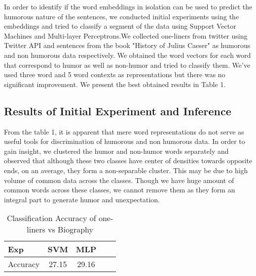 \documentclass{acm_proc_article-sp}
\begin{document}
In order to identify if the word embeddings in isolation can be used to predict the humorous nature of the sentences, we conducted initial experiments using the embeddings and tried to classify a segment of the data using Support Vector Machines and Multi-layer Perceptrons.We collected one-liners from twitter using Twitter API and sentences from the book "History of Julius Caeser" as humorous and non humorous data respectively.
We obtained the word vectors for each word that correspond to humor as well as non-humor and tried to classify them. We've used three word and 5 word contexts as representations but there was no significant improvement. We present the best obtained results in Table 1.


\subsection{ Results of Initial Experiment and Inference}

From the table 1, it is apparent that mere word representations do not serve as useful tools for discrimination of humorous and non humorous data.
In order to gain insight, we clustered the humor and non-humor words separately and observed that although these two classes have center of densities towards opposite ends, on an average, they form a non-separable cluster. 
This may be due to high volume of common data across the classes. Though we have huge amount of common words across these classes, we cannot remove them as they form an integral part to generate humor and unexpectation.

\begin{table}[h]
\caption{\label{initial}Classification Accuracy of one-liners vs Biography }

\vspace{8pt} %

\centering
\begin{tabular}{|l |c |c| c| c|}
\hline%
Exp &  SVM & MLP   \\
                 
\hline

Accuracy & 27.15 & 29.16  \\
\hline




\end{tabular}
\end{table}
\end{document}
